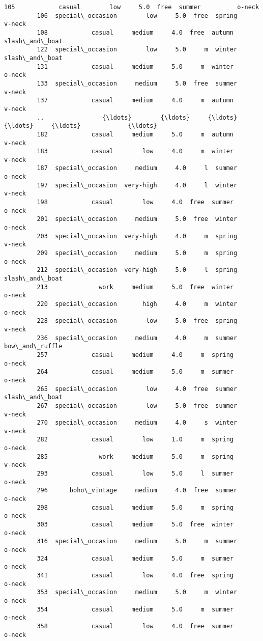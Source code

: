 \documentclass[11pt]{article}
\begin{document}
\begin{Verbatim}[commandchars=\\\{\}]
         105            casual        low     5.0  free  summer          o-neck   
         106  special\_occasion        low     5.0  free  spring          v-neck   
         108            casual     medium     4.0  free  autumn  slash\_and\_boat   
         122  special\_occasion        low     5.0     m  winter  slash\_and\_boat   
         131            casual     medium     5.0     m  winter          o-neck   
         133  special\_occasion     medium     5.0  free  summer          v-neck   
         137            casual     medium     4.0     m  autumn          v-neck   
         ..                {\ldots}        {\ldots}     {\ldots}   {\ldots}     {\ldots}             {\ldots}   
         182            casual     medium     5.0     m  autumn          v-neck   
         183            casual        low     4.0     m  winter          v-neck   
         187  special\_occasion     medium     4.0     l  summer          o-neck   
         197  special\_occasion  very-high     4.0     l  winter          v-neck   
         198            casual        low     4.0  free  summer          o-neck   
         201  special\_occasion     medium     5.0  free  winter          o-neck   
         203  special\_occasion  very-high     4.0     m  spring          v-neck   
         209  special\_occasion     medium     5.0     m  spring          o-neck   
         212  special\_occasion  very-high     5.0     l  spring  slash\_and\_boat   
         213              work     medium     5.0  free  winter          o-neck   
         220  special\_occasion       high     4.0     m  winter          o-neck   
         228  special\_occasion        low     5.0  free  spring          v-neck   
         236  special\_occasion     medium     4.0     m  summer  bow\_and\_ruffle   
         257            casual     medium     4.0     m  spring          o-neck   
         264            casual     medium     5.0     m  summer          o-neck   
         265  special\_occasion        low     4.0  free  summer  slash\_and\_boat   
         267  special\_occasion        low     5.0  free  summer          v-neck   
         270  special\_occasion     medium     4.0     s  winter          v-neck   
         282            casual        low     1.0     m  spring          o-neck   
         285              work     medium     5.0     m  spring          v-neck   
         293            casual        low     5.0     l  summer          o-neck   
         296      boho\_vintage     medium     4.0  free  summer          o-neck   
         298            casual     medium     5.0     m  spring          o-neck   
         303            casual     medium     5.0  free  winter          o-neck   
         316  special\_occasion     medium     5.0     m  summer          o-neck   
         324            casual     medium     5.0     m  summer          o-neck   
         341            casual        low     4.0  free  spring          o-neck   
         353  special\_occasion     medium     5.0     m  winter          o-neck   
         354            casual     medium     5.0     m  summer          o-neck   
         358            casual        low     4.0  free  summer          o-neck   
         

\end{Verbatim}
\end{document}
